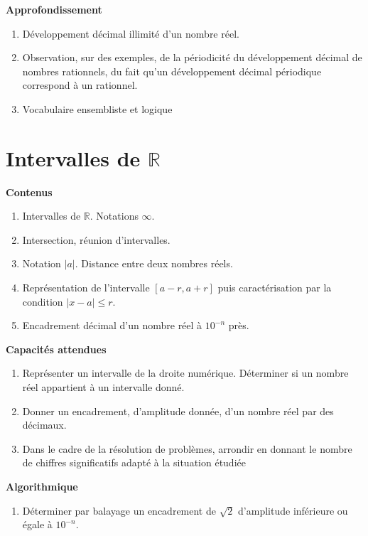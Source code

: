\documentclass[10pt,a4paper]{article}
\begin{document}
\textbf{Approfondissement}

\begin{enumerate}
\item Développement décimal illimité d'un nombre réel.
\item Observation, sur des exemples, de la périodicité du développement décimal de nombres rationnels, du fait qu'un développement décimal périodique correspond à un rationnel.
\item Vocabulaire ensembliste et logique
\end{enumerate}




\section{Intervalles de $\mathbb{R}$}

\textbf{Contenus}

\begin{enumerate}
\item Intervalles de  $\mathbb{R}$. Notations $\infty$.
\item Intersection, réunion d'intervalles.
\item Notation $|a|$. Distance entre deux nombres réels.
\item Représentation de l'intervalle $[a - r , a + r]$ puis caractérisation par la condition $|x - a| \leq r$.
\item Encadrement décimal d'un nombre réel à $10^{-n}$ près.
\end{enumerate}

\textbf{Capacités attendues}

\begin{enumerate}
\item Représenter un intervalle de la droite numérique. Déterminer si un nombre réel 
appartient à un intervalle donné.
\item Donner un encadrement, d’amplitude donnée, d’un nombre réel par des décimaux.
\item Dans le cadre de la résolution de problèmes, arrondir en donnant le nombre de 
chiffres significatifs adapté à la situation étudiée

\end{enumerate}




\textbf{Algorithmique}

\begin{enumerate}
\item Déterminer par balayage un encadrement de $\sqrt 2$ d’amplitude inférieure ou égale à $10^{-n}$.

\end{enumerate}
\end{document}
